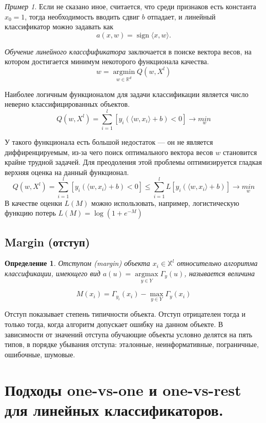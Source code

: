 \documentclass[a4paper, 12pt]{article}
\DeclareMathOperator{\argmin}{argmin }
\DeclareMathOperator{\argmax}{argmax }
\DeclareMathOperator{\sgn}{sign }
\theoremstyle{plain} %
\newtheorem{definition}{Определение}
\theoremstyle{definition} %
\theoremstyle{remark} %
\newtheorem{example}{Пример}
\begin{document}
\begin{example}
Если не сказано иное, считается, что среди признаков есть константа $x_{0} = 1$, тогда необходимость вводить сдвиг $b$ отпадает, и линейный классификатор можно задавать как
\[
	a(x,w) = \sgn \langle x,w \rangle .
\]

\emph{Обучение линейного классфификатора} заключается в поиске вектора весов, на котором достигается минимум некоторого функционала качества.
\[
	w=\underset{w\in\mathbb{R}^{d}}{\argmin} Q(w,X^{l})
\]

Наиболее логичным функционалом для задачи классификации является число неверно классифицированных объектов.
\[
	Q(w,X^{l}) = \sum^{l}_{i=1}\left[ y_{i}(\langle w,x_{i} \rangle +b)<0\right] \to \underset{w}{min}
\]

У такого функционала есть большой недостаток --- он не является диффиренцируемым, из-за чего поиск оптимального вектора весов $w$ становится крайне трудной задачей. Для преодоления этой проблемы оптимизируется гладкая верхняя оценка на данный функционал.
\[
	Q(w,X^{l}) = \sum^{l}_{i=1}\left[ y_{i}(\langle w,x_{i} \rangle +b)<0\right] \leqslant \sum^{l}_{i=1}L\left[ y_{i}(\langle w,x_{i} \rangle +b)\right] \to \underset{w}{min}
\]
В качестве оценки $L(M)$ можно использовать, например, логистическую функцию потерь $L(M) = \log(1+e^{-M})$

\subsection{Margin (отступ)}

\begin{definition}
		Отступом (margin) объекта $x_{i} \in \mathbb{X}^{l}$ относительно алгоритма классификации, имеющего вид $a(u) = \underset{y\in Y}{\argmax} \Gamma_{y}(u)$, называется величина
\end{definition}
\[
	M(x_{i}) = \Gamma_{y_{i}}(x_{i}) - \underset{y\in Y}{\max} \Gamma_{y}(x_{i})
\]

Отступ показывает степень типичности объекта. Отступ отрицателен тогда и только тогда, когда алгоритм допускает ошибку на данном объекте. В зависимости от значений отступа обучающие объекты условно делятся на пять типов, в порядке убывания отступа: эталонные, неинформативные, пограничные, ошибочные, шумовые.

\section{Подходы one-vs-one и one-vs-rest для линейных классификаторов.}


\end{example}
\end{document}
